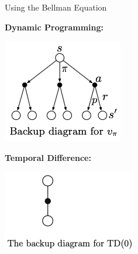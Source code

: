 \documentclass[11pt]{beamer}
\begin{document}
\begin{frame}{Using the Bellman Equation}

\begin{minipage}{.5\linewidth}
\textbf{Dynamic Programming:}


\begin{center}
\includegraphics[width=.45\linewidth]{images/backup_diagram_v}
\end{center}

\end{minipage}\begin{minipage}{.5\linewidth}

\textbf{Temporal Difference:}


\begin{center}
\includegraphics[width=.5\linewidth]{images/backup_td}
\end{center}


\end{minipage}

\end{frame}
\end{document}
